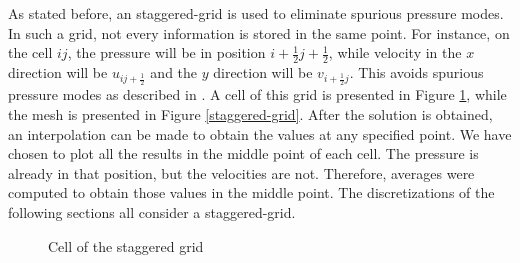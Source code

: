 \documentclass[journal]{IEEEtran}
\begin{document}
As stated before, an staggered-grid is used to eliminate spurious pressure modes. In such a grid, not every information is stored in the same point. For instance, on the cell $ij$, the pressure will be in position $i+\frac{1}{2}j+\frac{1}{2}$, while velocity in the $x$ direction will be $u_{ij+\frac{1}{2}}$ and the $y$ direction will be $v_{i+\frac{1}{2}j}$. This avoids spurious pressure modes as described in \cite{hinchLectureNotes}. A cell of this grid is presented in Figure \ref{grid-cell}, while the mesh is presented in Figure \ref{staggered-grid}. After the solution is obtained, an interpolation can be made to obtain the values at any specified point. We have chosen to plot all the results in the middle point of each cell. The pressure is already in that position, but the velocities are not. Therefore, averages were computed to obtain those values in the middle point. The discretizations of the following sections all consider a staggered-grid.

\begin{figure}[!ht]
\centering
{}
\caption{Cell of the staggered grid\label{grid-cell}}
\end{figure}
\end{document}
